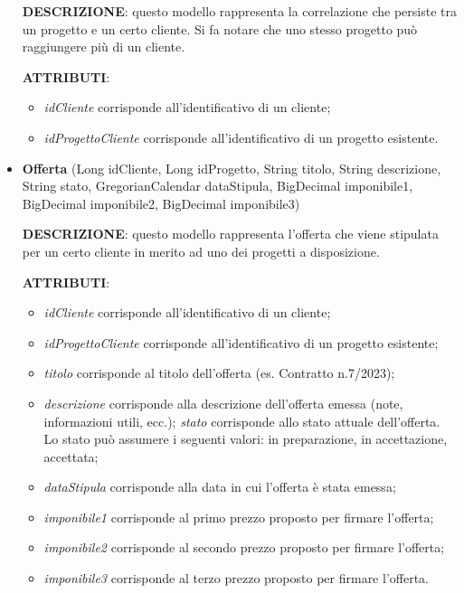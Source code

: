 \begin{itemize}
\textbf{DESCRIZIONE}: questo modello rappresenta la correlazione che persiste tra un progetto e un certo cliente. Si fa notare che uno stesso progetto può raggiungere più di un cliente.

\setlength{\parskip}{3ex}

\textbf{ATTRIBUTI}:
\begin{itemize}
\item \textit{idCliente} corrisponde all'identificativo di un cliente;
\item \textit{idProgettoCliente} corrisponde all'identificativo di un progetto esistente.
\end{itemize}

\pagebreak

\item \textbf{Offerta} (Long idCliente, Long idProgetto, String titolo, String descrizione, String stato, GregorianCalendar dataStipula, BigDecimal imponibile1, BigDecimal imponibile2, BigDecimal imponibile3)

\setlength{\parskip}{3ex}

\textbf{DESCRIZIONE}: questo modello rappresenta l'offerta che viene stipulata per un certo cliente in merito ad uno dei progetti a disposizione.

\setlength{\parskip}{3ex}

\textbf{ATTRIBUTI}:
\begin{itemize}
\item \textit{idCliente} corrisponde all'identificativo di un cliente;
\item \textit{idProgettoCliente} corrisponde all'identificativo di un progetto esistente;
\item \textit{titolo} corrisponde al titolo dell'offerta (es. Contratto n.7/2023);
\item \textit{descrizione} corrisponde alla descrizione dell'offerta emessa (note, informazioni utili, ecc.);
\textit{stato} corrisponde allo stato attuale dell'offerta. Lo stato può assumere i seguenti valori: in preparazione, in accettazione, accettata;
\item \textit{dataStipula} corrisponde alla data in cui l'offerta è stata emessa;
\item \textit{imponibile1} corrisponde al primo prezzo proposto per firmare l'offerta;
\item \textit{imponibile2} corrisponde al secondo prezzo proposto per firmare l'offerta;
\item \textit{imponibile3} corrisponde al terzo prezzo proposto per firmare l'offerta.
\end{itemize}
\end{itemize}

